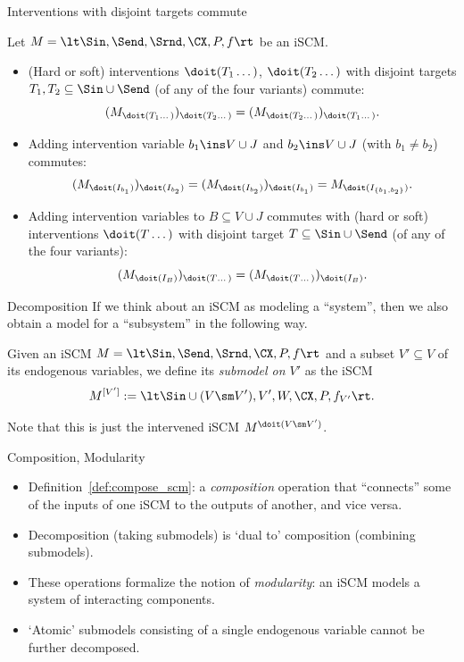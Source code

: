 \begin{frame}{Interventions with disjoint targets commute}
\begin{Prp}[\ref{prp:interventions_commute}, \ref{prp:adding_intervention_variables_one_by_one}, \ref{prp:adding_intervention_variables_commutes}]
Let $M = \lt \Sin, \Send, \Srnd, \CX, P, f \rt$ be an iSCM.
  \begin{itemize}
    \item
(Hard or soft) interventions $\doit(T_1\dots)$, $\doit(T_2\dots)$ with disjoint targets $T_1, T_2 \subseteq \Sin \cup \Send$ (of any of the four variants) commute:
  $$(M_{\doit(T_1\dots)})_{\doit(T_2\dots)} = (M_{\doit(T_2\dots)})_{\doit(T_1\dots)}.$$
\item
Adding intervention variable $b_1 \ins V \cup J$ and $b_2 \ins V \cup J$ (with $b_1 \ne b_2$) commutes:
  $$(M_{\doit(I_{b_1})})_{\doit(I_{b_2})} = (M_{\doit(I_{b_2})})_{\doit(I_{b_1})} = M_{\doit(I_{\{b_1,b_2\}})}.$$
\item 
  Adding intervention variables to $B \subseteq V \cup J$ commutes with (hard or soft) interventions $\doit(T\dots)$ with disjoint target $T \subseteq \Sin \cup \Send$ (of any of the four variants):
  $$(M_{\doit(I_B)})_{\doit(T\dots)} = (M_{\doit(T\dots)})_{\doit(I_B)}.$$
  \end{itemize}
\end{Prp}
\end{frame}

\begin{frame}{Decomposition}
  If we think about an iSCM as modeling a ``system'', then we also obtain a model for a ``subsystem'' in the following way.

  \begin{Def}[\ref{def:sub_scm}]
  Given an iSCM $M = \lt \Sin, \Send, \Srnd, \CX, P, f \rt$ and a subset $V' \subseteq V$ of its endogenous variables, we define its \emph{submodel on $V'$} as the iSCM
    $$M^{[V']} := \lt \Sin \cup (V \sm V'), V', W,\CX,P,f_{V'} \rt.$$
  \end{Def}
  Note that this is just the intervened iSCM $M^{\doit(V \sm V')}$.
\end{frame}

\begin{frame}{Composition, Modularity}
  \begin{itemize}
    \item Definition~\ref{def:compose_scm}: a \emph{composition} operation that ``connects'' some of the inputs of one iSCM to the outputs of another, and vice versa.
    \item Decomposition (taking submodels) is `dual to' composition (combining submodels).
    \item These operations formalize the notion of \emph{modularity}: an iSCM models a system of interacting components.
    \item `Atomic' submodels consisting of a single endogenous variable cannot be further decomposed.
  \end{itemize}      
\end{frame}

